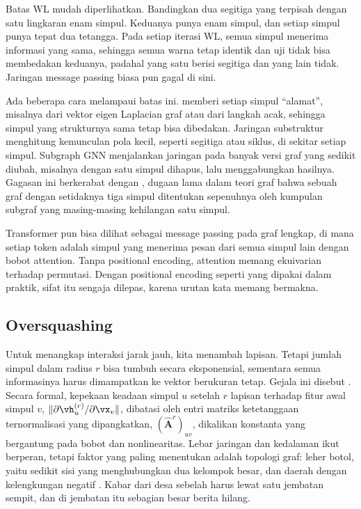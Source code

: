 Batas WL mudah diperlihatkan. Bandingkan dua segitiga yang terpisah dengan satu lingkaran enam
simpul. Keduanya punya enam simpul, dan setiap simpul punya tepat dua tetangga. Pada setiap iterasi
WL, semua simpul menerima informasi yang sama, sehingga semua warna tetap identik dan uji tidak
bisa membedakan keduanya, padahal yang satu berisi segitiga dan yang lain tidak. Jaringan message
passing biasa pun gagal di sini.

Ada beberapa cara melampaui batas ini.  memberi setiap simpul ``alamat'',
misalnya dari vektor eigen Laplacian graf atau dari langkah acak, sehingga simpul yang
strukturnya sama tetap bisa dibedakan. Jaringan substruktur menghitung kemunculan pola kecil,
seperti segitiga atau siklus, di sekitar setiap simpul. Subgraph GNN menjalankan jaringan pada
banyak versi graf yang sedikit diubah, misalnya dengan satu simpul dihapus, lalu menggabungkan
hasilnya. Gagasan ini berkerabat dengan , dugaan lama dalam teori
graf bahwa sebuah graf dengan setidaknya tiga simpul ditentukan sepenuhnya oleh kumpulan subgraf
yang masing-masing kehilangan satu simpul.

Transformer pun bisa dilihat sebagai message passing pada graf lengkap, di mana setiap token adalah
simpul yang menerima pesan dari semua simpul lain dengan bobot attention. Tanpa positional
encoding, attention memang ekuivarian terhadap permutasi. Dengan positional encoding seperti yang
dipakai dalam praktik, sifat itu sengaja dilepas, karena urutan kata memang bermakna.

\subsection{Oversquashing}

Untuk menangkap interaksi jarak jauh, kita menambah lapisan. Tetapi jumlah simpul dalam radius $r$
bisa tumbuh secara eksponensial, sementara semua informasinya harus dimampatkan ke vektor
berukuran tetap. Gejala ini disebut  \citep{alon2021}. Secara formal, kepekaan
keadaan simpul $u$ setelah $r$ lapisan terhadap fitur awal simpul $v$,
$\|\partial\vh_u^{(r)}/\partial\vx_v\|$, dibatasi oleh entri matriks ketetanggaan ternormalisasi
yang dipangkatkan, $(\hat{\bm A}^r)_{uv}$, dikalikan konstanta yang bergantung pada bobot dan
nonlinearitas. Lebar jaringan dan kedalaman ikut berperan, tetapi faktor yang paling menentukan
adalah topologi graf: leher botol, yaitu sedikit sisi yang menghubungkan dua kelompok besar, dan
daerah dengan kelengkungan negatif \citep{topping2022}. Kabar dari desa sebelah harus lewat satu
jembatan sempit, dan di jembatan itu sebagian besar berita hilang.

